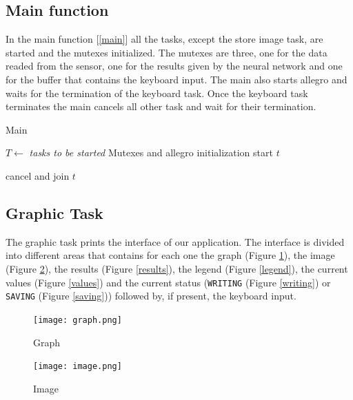 \documentclass[12pt]{article}
\begin{document}
\subsection{Main function}
In the main function [\ref{main}] all the tasks, except the store image task,
are started and the mutexes initialized. The mutexes are three, one for the
data readed from the sensor, one for the results given by the neural
network and one for the buffer that contains the keyboard input. The main also 
starts allegro and waits for the termination of the
keyboard task. Once the keyboard task terminates the main cancels all other
task and wait for their termination.

\begin{algorithm}[t]
\caption{Main}
\label{main}

\begin{algorithmic}
\State $T\gets$ \textit{tasks to be started}
\State Mutexes and allegro initialization
    \State start $t$
\EndFor

\EndLoop

    \State cancel and join $t$
\EndFor

\end{algorithmic}
\end{algorithm}

\subsection{Graphic Task}

The graphic task prints the interface of our application. The
interface is divided into different areas that contains for each one the
graph (Figure \ref{graph}), the image (Figure \ref{image}), the results (Figure \ref{results}), the legend (Figure \ref{legend}), the current values (Figure \ref{values}) and the current
status (\texttt{WRITING} (Figure \ref{writing}) or \texttt{SAVING} (Figure \ref{saving})) followed by, if present, the
keyboard input.

\begin{figure}[!t]
    \centering
    \texttt{[image: graph.png]}
    \caption{Graph}
    \label{graph}
\end{figure}

\begin{figure}[!t]
    \centering
    \texttt{[image: image.png]}
    \caption{Image}
    \label{image}
\end{figure}
\end{document}
